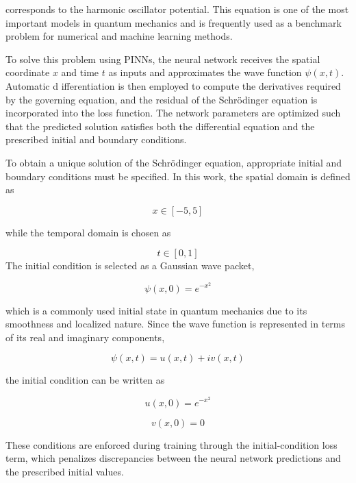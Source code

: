 \documentclass[11pt]{article}
\begin{document}
corresponds to the harmonic oscillator potential. 
This equation is one of the most important models in 
quantum mechanics and is frequently used as a benchmark 
problem for numerical and machine learning methods.

To solve this problem using PINNs, the neural 
network receives the spatial coordinate 
$x$ and time $t$ as inputs and approximates 
the wave function $\psi(x,t)$. Automatic d
ifferentiation is then employed to compute 
the derivatives required by the governing equation, 
and the residual of the Schrödinger equation is 
incorporated into the loss function. The network 
parameters are optimized such that the predicted 
solution satisfies both the differential equation 
and the prescribed initial and boundary conditions.


To obtain a unique solution of the Schrödinger equation, 
appropriate initial and boundary conditions must be specified.
In this work, the spatial domain is defined as

\begin{equation}
	x \in [-5,5]
\end{equation}


while the temporal domain is chosen as

\begin{equation}
	t \in [0,1]
\end{equation}
The initial condition is selected as a Gaussian wave packet,

\begin{equation}
	\psi(x,0)=e^{-x^2}
\end{equation}

which is a commonly used initial state in quantum mechanics 
due to its smoothness and localized nature. Since the wave 
function is represented in terms of its real and imaginary 
components,

\begin{equation}
	\psi(x,t)=u(x,t)+iv(x,t)
\end{equation}

the initial condition can be written as

\begin{equation}
	u(x,0)=e^{-x^2}
\end{equation}


\begin{equation}
	v(x,0)=0
\end{equation}

These conditions are enforced during training through the initial-condition 
loss term, which penalizes discrepancies between the 
neural network predictions and the prescribed initial values.
\end{document}
